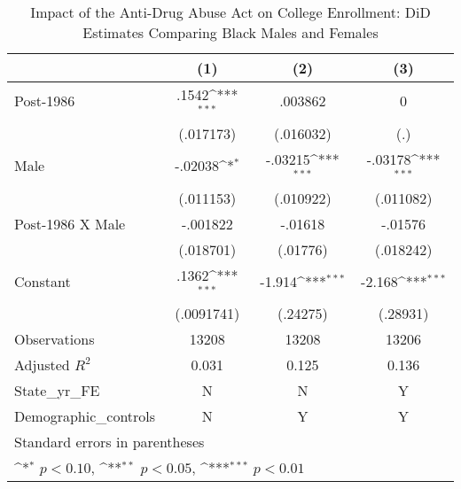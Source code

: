 \begin{table}[htbp]\centering
\def\sym#1{\ifmmode^{#1}\else\(^{#1}\)\fi}
\caption{Impact of the Anti-Drug Abuse Act on College Enrollment: DiD Estimates Comparing Black Males and Females}
\begin{tabular}{l*{3}{c}}
\hline\hline
                    &\multicolumn{1}{c}{(1)}         &\multicolumn{1}{c}{(2)}         &\multicolumn{1}{c}{(3)}         \\
\hline
Post-1986           &       .1542\sym{***}&     .003862         &           0         \\
                    &   (.017173)         &   (.016032)         &         (.)         \\
[1em]
Male                &     -.02038\sym{*}  &     -.03215\sym{***}&     -.03178\sym{***}\\
                    &   (.011153)         &   (.010922)         &   (.011082)         \\
[1em]
Post-1986 X Male    &    -.001822         &     -.01618         &     -.01576         \\
                    &   (.018701)         &    (.01776)         &   (.018242)         \\
[1em]
Constant            &       .1362\sym{***}&      -1.914\sym{***}&      -2.168\sym{***}\\
                    &  (.0091741)         &    (.24275)         &    (.28931)         \\
\hline
Observations        &       13208         &       13208         &       13206         \\
Adjusted \(R^{2}\)  &       0.031         &       0.125         &       0.136         \\
State\_yr\_FE         &           N         &           N         &           Y         \\
Demographic\_controls&           N         &           Y         &           Y         \\
\hline\hline
\multicolumn{4}{l}{\footnotesize Standard errors in parentheses}\\
\multicolumn{4}{l}{\footnotesize \sym{*} \(p<0.10\), \sym{**} \(p<0.05\), \sym{***} \(p<0.01\)}\\
\end{tabular}
\end{table}
